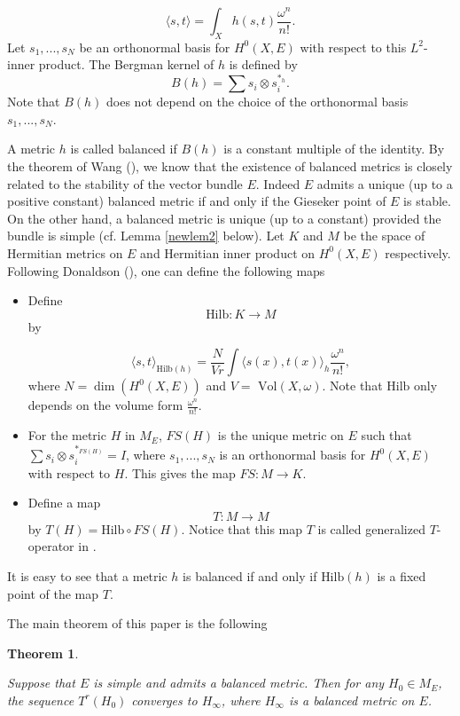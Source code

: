 \documentclass[12pt,oneside,notitlepage]{amsart}
\newtheorem{thm}{Theorem}[section]
\theoremstyle{definition}
\theoremstyle{remark}
\numberwithin{equation}{section}
\begin{document}
$$\langle s,t\rangle= \int_{X} h(s,t)\frac{\omega^n}{n!}.$$
Let $s_{1},...,s_{N}$ be an orthonormal basis for $H^{0}(X,E)$
with respect to this $L^2$-inner product. The Bergman kernel of
$h$ is defined by $$B(h)=\sum s_{i}\otimes s_{i}^{*_{h}}.$$ Note
that $B(h)$ does not depend on the choice of the orthonormal basis
$s_{1},...,s_{N}$.

A metric $h$ is called balanced if $B(h)$ is a constant multiple
of the identity. By the theorem of Wang (\cite[Theorem 1.1]{W}),
we know that the existence of balanced metrics is closely related
to the stability of the vector bundle $E$. Indeed $E$ admits a
unique (up to a positive constant) balanced metric if and only if
the Gieseker point of $E$ is stable. On the other hand, a balanced
metric is unique (up to a constant) provided the bundle is simple
(cf. Lemma \ref{newlem2} below). Let $K$ and $M$ be  the space of
Hermitian metrics on $E$ and Hermitian inner product on
$H^{0}(X,E)$ respectively. Following Donaldson (\cite{D2}), one
can define the following maps

\begin{itemize}

\item Define $$\textrm{Hilb}: K \rightarrow M$$ by

 $$\langle s,t \rangle _{\textrm{Hilb}(h)}= \frac{N}{Vr} \int
\langle s(x),t(x) \rangle_{h}\frac{\omega^n}{n!},$$where
$N=\dim(H^{0}(X,E)) $ and $V=\textrm{  Vol}(X,\omega)$. Note that
$\textrm{Hilb}$ only depends on the volume form
$\frac{\omega^{n}}{n!}$.

\item For the metric $H$ in $M_{E}$, $FS(H)$ is the unique metric
on $E$ such that  $\sum s_{i}\otimes s_{i}^{*_{FS(H)}}=I$, where
$s_{1},...,s_{N}$ is an orthonormal basis for $H^{0}(X,E)$ with
respect to $H$. This gives the map $FS:M \rightarrow K$.

\item Define a map $$T:M \rightarrow M$$ by $T(H)=\textrm{Hilb}
\circ FS(H).$ Notice that this map $T$ is called generalized
$T$-operator in \cite{DKLR}.

\end{itemize}

It is easy to see that a metric $h$ is balanced if and only if
$\textrm{Hilb}(h)$ is a fixed point of the map $T$.

The main theorem of this paper is the following
\begin{thm}\label{firstthm}

Suppose that $E$ is simple and admits a balanced metric. Then for
any $H_{0}\in M_{E}$, the sequence $T^r(H_{0})$ converges to
$H_{\infty}$, where $H_{\infty}$ is a balanced metric on $E$.

\end{thm}
\end{document}
